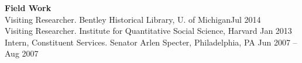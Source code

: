 \begin{minipage}{\linewidth}
{\large \textbf{Field Work}}\\
Visiting Researcher. Bentley Historical Library, U. of Michigan\hfill{Jul 2014}\\
Visiting Researcher. Institute for Quantitative Social Science, Harvard \hfill{Jan 2013}\\
Intern, Constituent Services. Senator Arlen Specter, Philadelphia, PA  \hfill{Jun 2007 – Aug 2007}
\end{minipage}